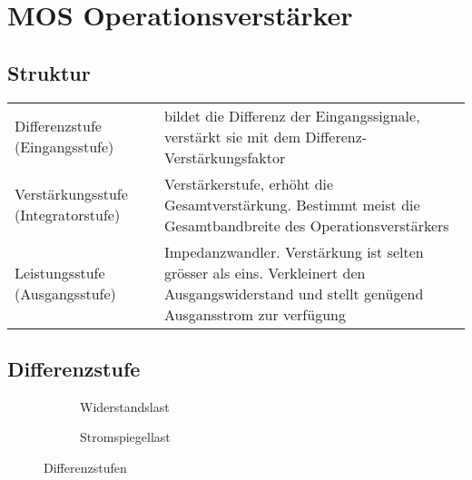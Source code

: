 \section{MOS Operationsverstärker}

\subsection{Struktur}
\begin{tabular}{p{3cm}p{15cm}}
	Differenzstufe (Eingangsstufe) & bildet die Differenz der Eingangssignale,
	verstärkt sie mit dem Differenz-Verstärkungsfaktor\\
	Verstärkungsstufe	(Integratorstufe) & Verstärkerstufe, erhöht die
	Gesamtverstärkung. Bestimmt meist die Gesamtbandbreite des
	Operationsverstärkers\\
	Leistungsstufe (Ausgangsstufe) & Impedanzwandler. Verstärkung ist selten
	grösser als eins. Verkleinert den Ausgangswiderstand und stellt genügend
	Ausgansstrom zur verfügung\\
\end{tabular}

\subsection{Differenzstufe}
\begin{figure}[h]
	\centering
	\begin{subfigure}[b]{5cm}
		\centering
		{}
		\caption{Widerstandslast}
	\end{subfigure}\qquad
	\begin{subfigure}[b]{5cm}
		\centering
		{}
		\caption{Stromspiegellast}
	\end{subfigure}
	\caption{Differenzstufen}
	\label{fig:Differenzstufen}
\end{figure}\\


